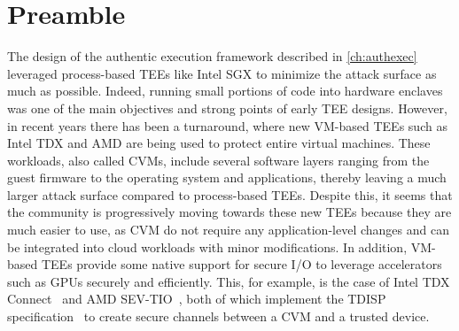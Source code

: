 \section*{Preamble}

The design of the authentic execution framework described in \cref{ch:authexec}
leveraged process-based \acsp{TEE} like Intel \acs{SGX} to minimize the attack
surface as much as possible. Indeed, running small portions of code into
hardware enclaves was one of the main objectives and strong points of early
\acs{TEE} designs. However, in recent years there has been a turnaround, where
new \acs{VM}-based \acsp{TEE} such as Intel \acs{TDX} and AMD \sevsnpshort{} are
being used to protect entire virtual machines. These workloads, also called
\acp{CVM}, include several software layers ranging from the guest firmware to
the operating system and applications, thereby leaving a much larger attack
surface compared to process-based \acsp{TEE}. Despite this, it seems that the
community is progressively moving towards these new \acsp{TEE} because they are
much easier to use, as \ac{CVM} do not require any application-level changes and
can be integrated into cloud workloads with minor modifications. In addition,
\acs{VM}-based \acsp{TEE} provide some native support for secure I/O to leverage
accelerators such as GPUs securely and efficiently. This, for example, is the
case of Intel \acs{TDX} Connect~\cite{intelTdxConnect} and AMD
\acs{SEV}-TIO~\cite{AmdSevTioWhitepaper}, both of which implement the \ac{TDISP}
specification~\cite{tdispSpec} to create secure channels between a \ac{CVM} and
a trusted device.

